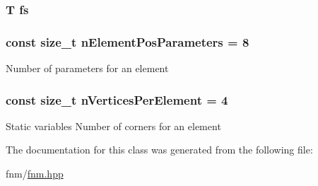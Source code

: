 \hypertarget{classfnm_1_1Aperture_aeba68ad214d4eb5ef51b3f3763d099dd}{
\subsubsection[{fs}]{\setlength{\rightskip}{0pt plus 5cm}T fs\hspace{0.3cm}{\ttfamily [static]}}}\label{classfnm_1_1Aperture_aeba68ad214d4eb5ef51b3f3763d099dd}
\hypertarget{classfnm_1_1Aperture_adaffd7c31c339cecbb613daa7eae4f64}{
\subsubsection[{n\+Element\+Pos\+Parameters}]{\setlength{\rightskip}{0pt plus 5cm}const size\+\_\+t n\+Element\+Pos\+Parameters = 8\hspace{0.3cm}{\ttfamily [static]}}}\label{classfnm_1_1Aperture_adaffd7c31c339cecbb613daa7eae4f64}
Number of parameters for an element \hypertarget{classfnm_1_1Aperture_ac08006cf2e1c77856e2332b6d98ca861}{
\subsubsection[{n\+Vertices\+Per\+Element}]{\setlength{\rightskip}{0pt plus 5cm}const size\+\_\+t n\+Vertices\+Per\+Element = 4\hspace{0.3cm}{\ttfamily [static]}}}\label{classfnm_1_1Aperture_ac08006cf2e1c77856e2332b6d98ca861}
Static variables Number of corners for an element 

The documentation for this class was generated from the following file\+:\begin{DoxyCompactItemize}
\item 
fnm/\hyperlink{fnm_8hpp}{fnm.\+hpp}\end{DoxyCompactItemize}
